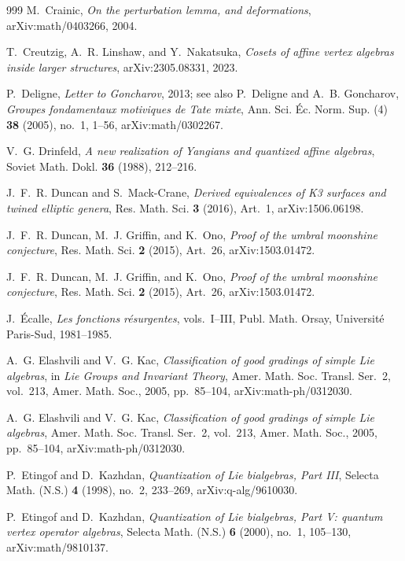 \documentclass[11pt]{memoir}
\begin{document}
\begin{thebibliography}{999}
M.~Crainic, \emph{On the perturbation lemma, and deformations}, arXiv:math/0403266, 2004.

T.~Creutzig, A.~R. Linshaw, and Y.~Nakatsuka, \emph{Cosets of affine vertex algebras inside larger structures}, arXiv:2305.08331, 2023.

P.~Deligne, \emph{Letter to Goncharov}, 2013; see also P.~Deligne and A.~B. Goncharov, \emph{Groupes fondamentaux motiviques de Tate mixte}, Ann. Sci. \'Ec. Norm. Sup. (4) \textbf{38} (2005), no.~1, 1--56, arXiv:math/0302267.

V.~G. Drinfeld, \emph{A new realization of Yangians and quantized affine algebras}, Soviet Math. Dokl. \textbf{36} (1988), 212--216.

J.~F.~R. Duncan and S.~Mack-Crane, \emph{Derived equivalences of K3 surfaces and twined elliptic genera}, Res. Math. Sci. \textbf{3} (2016), Art.~1, arXiv:1506.06198.

J.~F.~R. Duncan, M.~J. Griffin, and K.~Ono, \emph{Proof of the umbral moonshine conjecture}, Res. Math. Sci. \textbf{2} (2015), Art.~26, arXiv:1503.01472.

J.~F.~R. Duncan, M.~J. Griffin, and K.~Ono, \emph{Proof of the umbral moonshine conjecture}, Res. Math. Sci. \textbf{2} (2015), Art.~26, arXiv:1503.01472.

J.~\'Ecalle, \emph{Les fonctions r\'esurgentes}, vols.~I--III, Publ. Math. Orsay, Universit\'e Paris-Sud, 1981--1985.

A.~G. Elashvili and V.~G. Kac, \emph{Classification of good gradings of simple Lie algebras}, in \emph{Lie Groups and Invariant Theory}, Amer. Math. Soc. Transl. Ser.~2, vol.~213, Amer. Math. Soc., 2005, pp.~85--104, arXiv:math-ph/0312030.

A.~G. Elashvili and V.~G. Kac, \emph{Classification of good gradings of simple Lie algebras}, Amer. Math. Soc. Transl. Ser.~2, vol.~213, Amer. Math. Soc., 2005, pp.~85--104, arXiv:math-ph/0312030.

P.~Etingof and D.~Kazhdan, \emph{Quantization of Lie bialgebras, Part III}, Selecta Math. (N.S.) \textbf{4} (1998), no.~2, 233--269, arXiv:q-alg/9610030.

P.~Etingof and D.~Kazhdan, \emph{Quantization of Lie bialgebras, Part V: quantum vertex operator algebras}, Selecta Math. (N.S.) \textbf{6} (2000), no.~1, 105--130, arXiv:math/9810137.


\end{thebibliography}
\end{document}
